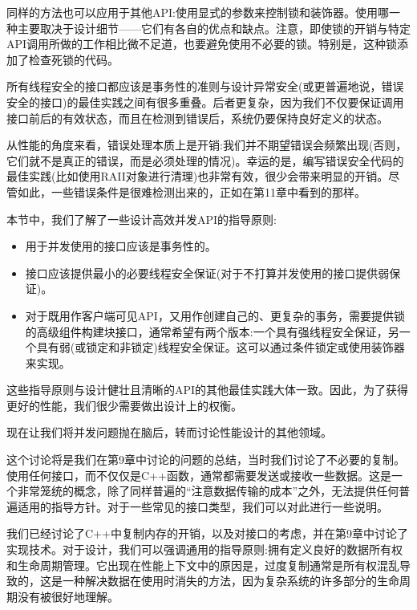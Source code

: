 同样的方法也可以应用于其他API:使用显式的参数来控制锁和装饰器。使用哪一种主要取决于设计细节——它们有各自的优点和缺点。注意，即使锁的开销与特定API调用所做的工作相比微不足道，也要避免使用不必要的锁。特别是，这种锁添加了检查死锁的代码。

所有线程安全的接口都应该是事务性的准则与设计异常安全(或更普遍地说，错误安全的接口)的最佳实践之间有很多重叠。后者更复杂，因为我们不仅要保证调用接口前后的有效状态，而且在检测到错误后，系统仍要保持良好定义的状态。 

从性能的角度来看，错误处理本质上是开销:我们并不期望错误会频繁出现(否则，它们就不是真正的错误，而是必须处理的情况)。幸运的是，编写错误安全代码的最佳实践(比如使用RAII对象进行清理)也非常有效，很少会带来明显的开销。尽管如此，一些错误条件是很难检测出来的，正如在第11章中看到的那样。

本节中，我们了解了一些设计高效并发API的指导原则:

\begin{itemize}
\item 
用于并发使用的接口应该是事务性的。

\item 
接口应该提供最小的必要线程安全保证(对于不打算并发使用的接口提供弱保证)。

\item 
对于既用作客户端可见API，又用作创建自己的、更复杂的事务，需要提供锁的高级组件构建块接口，通常希望有两个版本:一个具有强线程安全保证，另一个具有弱(或锁定和非锁定)线程安全保证。这可以通过条件锁定或使用装饰器来实现。
\end{itemize}

这些指导原则与设计健壮且清晰的API的其他最佳实践大体一致。因此，为了获得更好的性能，我们很少需要做出设计上的权衡。 

现在让我们将并发问题抛在脑后，转而讨论性能设计的其他领域。


这个讨论将是我们在第9章中讨论的问题的总结，当时我们讨论了不必要的复制。使用任何接口，而不仅仅是C++函数，通常都需要发送或接收一些数据。这是一个非常笼统的概念，除了同样普遍的“注意数据传输的成本”之外，无法提供任何普遍适用的指导方针。对于一些常见的接口类型，我们可以对此进行一些说明。 

我们已经讨论了C++中复制内存的开销，以及对接口的考虑，并在第9章中讨论了实现技术。对于设计，我们可以强调通用的指导原则:拥有定义良好的数据所有权和生命周期管理。它出现在性能上下文中的原因是，过度复制通常是所有权混乱导致的，这是一种解决数据在使用时消失的方法，因为复杂系统的许多部分的生命周期没有被很好地理解。 

